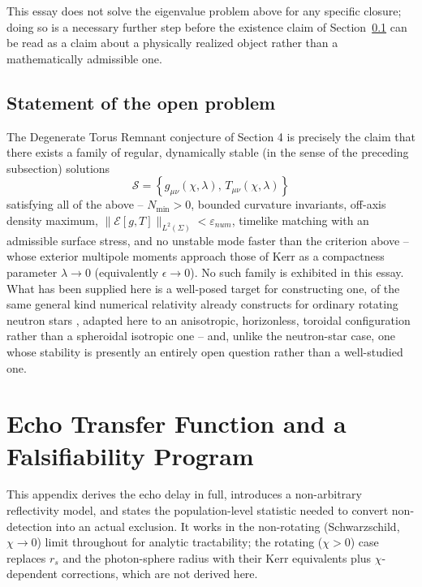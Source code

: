 \documentclass[11pt]{article}
\begin{document}
This essay does not solve the eigenvalue problem above for any specific closure; doing so is a necessary further step before the existence claim of Section~\ref{app:toroidal_openproblem} can be read as a claim about a physically realized object rather than a mathematically admissible one.

\subsection{Statement of the open problem}
\label{app:toroidal_openproblem}

The Degenerate Torus Remnant conjecture of Section 4 is precisely the claim that there exists a family of regular, dynamically stable (in the sense of the preceding subsection) solutions
\begin{equation}
\mathscr{S} = \left\{g_{\mu\nu}(\chi,\lambda),\, T_{\mu\nu}(\chi,\lambda)\right\}
\end{equation}
satisfying all of the above -- $N_{\min}>0$, bounded curvature invariants, off-axis density maximum, $\|\mathcal{E}[g,T]\|_{L^2(\Sigma)}<\varepsilon_{num}$, timelike matching with an admissible surface stress, and no unstable mode faster than the criterion above -- whose exterior multipole moments approach those of Kerr as a compactness parameter $\lambda\to0$ (equivalently $\epsilon\to0$). No such family is exhibited in this essay. What has been supplied here is a well-posed target for constructing one, of the same general kind numerical relativity already constructs for ordinary rotating neutron stars \cite{stergioulas2003,friedmanstergioulas2013}, adapted here to an anisotropic, horizonless, toroidal configuration rather than a spheroidal isotropic one -- and, unlike the neutron-star case, one whose stability is presently an entirely open question rather than a well-studied one.

\section{Echo Transfer Function and a Falsifiability Program}
\label{app:echo}

This appendix derives the echo delay in full, introduces a non-arbitrary reflectivity model, and states the population-level statistic needed to convert non-detection into an actual exclusion. It works in the non-rotating (Schwarzschild, $\chi\to0$) limit throughout for analytic tractability; the rotating ($\chi>0$) case replaces $r_s$ and the photon-sphere radius with their Kerr equivalents plus $\chi$-dependent corrections, which are not derived here.
\end{document}
